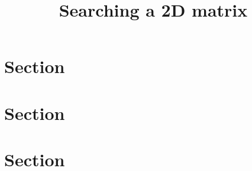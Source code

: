 \documentclass[12pt]{article}
\title{Searching a 2D matrix}
\begin{document}
\maketitle
\section{Section}

\section{Section}

\section{Section}
\end{document}
